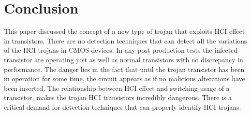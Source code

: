 \documentclass[12pt,conference]{IEEEtran}
\begin{document}
\section*{Conclusion}
This paper discussed the concept of a new type of trojan that exploits HCI effect in transistors.  There are no detection techniques that can detect all the variations of the HCI trojans in CMOS devices.  In any post-production tests the infected transistor are operating just as well as normal transistors with no discrepancy in performance.  The danger lies in the fact that until the trojan transistor has been in operation for some time, the circuit appears as if no malicious alterations have been inserted.  The relationship between HCI effect and switching usage of a transistor, makes the trojan HCI transistors incredibly dangerous.   There is a critical demand for detection techniques that can properly identify HCI trojans.  





\end{document}
